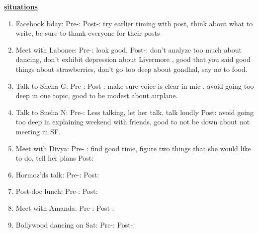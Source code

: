 \documentclass[11pt]{article}
\begin{document}
\underline{\textbf{situations}} \\
\begin{enumerate}
\item Facebook bday: Pre-:  Post-: try earlier timing with post, think
  about what to write, be sure to thank everyone for their posts
\item Meet with Labonee: Pre-: look good,   Post-: don't analyze too
  much about dancing, don't exhibit depression about Livermore , good
  that you said good things about strawberries, don't go too deep
  about gondhal, say no to food.
\item Talk to Sneha G:  Pre-:  Post-: make sure voice is clear in
  mic , avoid going too deep in one topic, good to be modest about
  airplane.
\item Talk to Sneha N:  Pre-: Less talking, let her talk, talk loudly
  Post:  avoid going too deep in
  explaining weekend with friends, good to not be down about not
  meeting in SF.

\item Meet with Divya: Pre- :  find good time, figure two things that
  she would like to do, tell her plans   Post:

\item Hormoz'ds talk: Pre-:   Post:

\item Post-doc lunch: Pre-:  Post:

\item Meet with Amanda: Pre-:   Post-:
\item Bollywood dancing on Sat:  Pre-:   Post-:

\end{enumerate}
\end{document}
